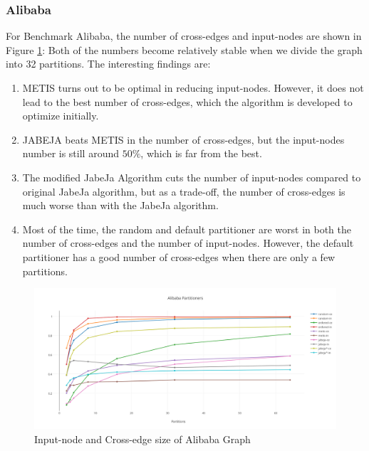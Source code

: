 \subsubsection{Alibaba}
For Benchmark Alibaba, the number of cross-edges and input-nodes are shown in Figure \ref{fig:Alibaba-Partitioners}: Both of the numbers become relatively stable when we divide the graph into 32 partitions. The interesting findings are:
\begin{enumerate}
    \item METIS turns out to be optimal in reducing input-nodes. However, it does not lead to the best number of cross-edges, which the algorithm is developed to optimize initially.
    \item JABEJA beats METIS in the number of cross-edges, but the input-nodes number is still around $50\%$, which is far from the best.
    \item The modified JabeJa Algorithm cuts the number of input-nodes compared to original JabeJa algorithm, but as a trade-off, the number of cross-edges is much worse than with the JabeJa algorithm.
    \item Most of the time, the random and default partitioner are worst in both the number of cross-edges and the number of input-nodes. However, the default partitioner has a good number of cross-edges when there are only a few partitions.
\end{enumerate}
\begin{figure}[h!]
  \caption{Input-node and Cross-edge size of Alibaba Graph}
  \label{fig:Alibaba-Partitioners}
  \centering
    \includegraphics[width=1.0\textwidth]{img/Alibaba-Partitioners}
\end{figure}

